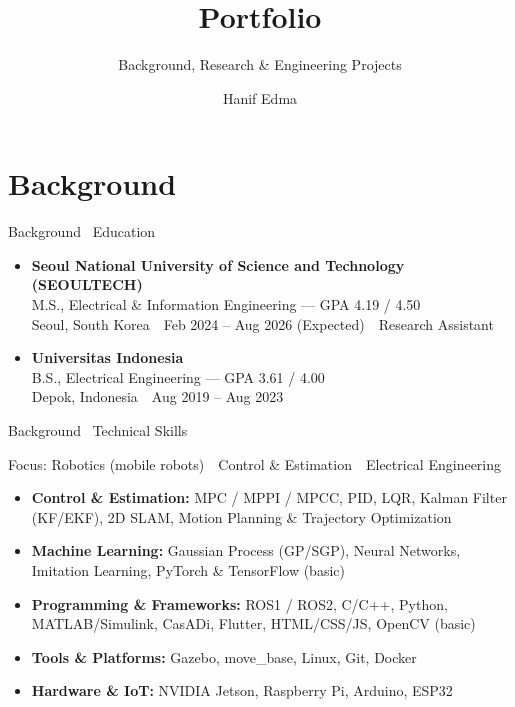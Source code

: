 \documentclass[aspectratio=169,11pt]{beamer}
\title[Portfolio]{Portfolio}
\subtitle{Background, Research \& Engineering Projects}
\author[Hanif Edma]{Hanif Edma}
\institute[hanifedma.com]{\url{https://hanifedma.com/portfolio_presentation}}
\date{}
\newcommand{\sectsuffix}[1]{\,{\normalfont\mdseries\,\textemdash\ #1}}
\begin{document}
\begin{frame}[plain]
  \titlepage
\end{frame}

\section{Background}

\begin{frame}{Background\sectsuffix{Education}}
  \vfill
  \begin{itemize}\setlength\itemsep{16pt}
    \item \textbf{Seoul National University of Science and Technology (SEOULTECH)}\\[2pt]
          {\small M.S., Electrical \& Information Engineering --- GPA 4.19 / 4.50}\\[1pt]
          {\small\color{textsec} Seoul, South Korea \,\textbullet\, Feb 2024 -- Aug 2026 (Expected) \,\textbullet\, Research Assistant}
    \item \textbf{Universitas Indonesia}\\[2pt]
          {\small B.S., Electrical Engineering --- GPA 3.61 / 4.00}\\[1pt]
          {\small\color{textsec} Depok, Indonesia \,\textbullet\, Aug 2019 -- Aug 2023}
  \end{itemize}
  \vfill
\end{frame}

\begin{frame}{Background\sectsuffix{Technical Skills}}
  \begin{center}\small\color{textsec}
    Focus: Robotics (mobile robots) \,\textbullet\, Control \& Estimation \,\textbullet\, Electrical Engineering
  \end{center}
  \medskip
  \begin{itemize}\small\setlength\itemsep{7pt}
    \item \textbf{Control \& Estimation:} MPC / MPPI / MPCC, PID, LQR, Kalman Filter (KF/EKF), 2D SLAM, Motion Planning \& Trajectory Optimization
    \item \textbf{Machine Learning:} Gaussian Process (GP/SGP), Neural Networks, Imitation Learning, PyTorch \& TensorFlow (basic)
    \item \textbf{Programming \& Frameworks:} ROS1 / ROS2, C/C++, Python, MATLAB/Simulink, CasADi, Flutter, HTML/CSS/JS, OpenCV (basic)
    \item \textbf{Tools \& Platforms:} Gazebo, move\_base, Linux, Git, Docker
    \item \textbf{Hardware \& IoT:} NVIDIA Jetson, Raspberry Pi, Arduino, ESP32
  \end{itemize}
\end{frame}
\end{document}
